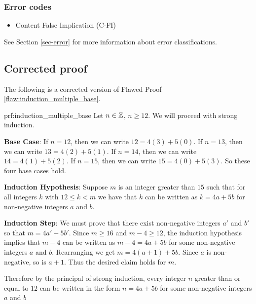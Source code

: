  
\subsubsection{Error codes}
\begin{itemize}
	\item Content False Implication (C-FI)
\end{itemize}
See Section \ref{sec-error} for more information about error classifications.

\clearpage
\subsection{Corrected proof}

The following is a corrected version of Flawed Proof \ref{flaw:induction_multiple_base}. 

\begin{prf}{prf:induction_multiple_base} 
Let $n \in \mathbb Z$, $n\geq 12$. We will proceed with strong induction. 

\noindent \textbf{Base Case}: If $n = 12$, then we can write $12 = 4(3) + 5(0)$. If $n = 13$, then we can write $13 = 4(2) + 5(1)$. If $n = 14$, then we can write $14 = 4(1) + 5(2)$. If $n = 15$, then we can write $15 = 4(0) + 5(3)$. So these four base cases hold. 

\noindent \textbf{Induction Hypothesis}: Suppose $m$ is an integer greater than $15$ such that for all integers $k$ with $12 \leq k < m$ we have that $k$ can be written as $k = 4a + 5b$ for non-negative integers $a$ and $b$. 


\noindent \textbf{Induction Step}: We must prove that there exist non-negative integers $a'$ and $b'$ so that $m = 4a' + 5b'$.  Since $m \geq 16$ and $m-4 \geq 12$, the induction hypothesis implies that $m-4$ can be written as $m-4 = 4a + 5b$ for some non-negative integers $a$ and $b$. Rearranging we get $m = 4(a+1) + 5b$. Since $a$ is non-negative, so is $a+1$. Thus the desired claim holds for $m$. 

Therefore by the principal of strong induction, every integer $n$ greater than or equal to $12$ can be written in the form $n = 4a + 5b$ for some non-negative integers $a$ and $b$
\end{prf}